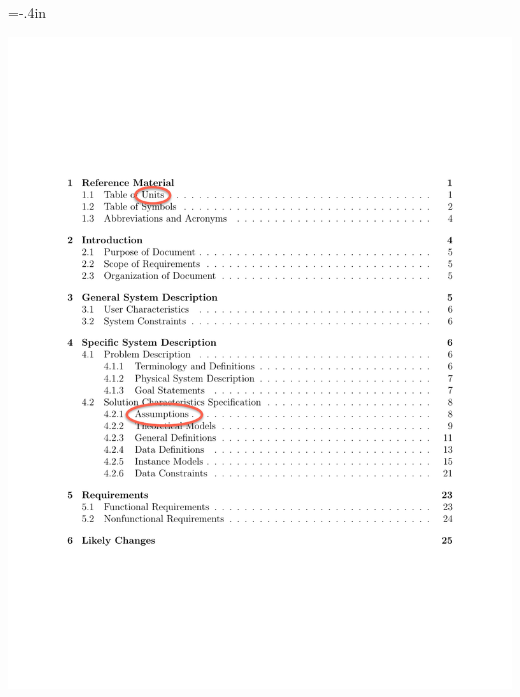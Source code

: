 \documentclass{beamer}
\begin{document}



\hoffset=-.4in %

\begin{frame}


\begin{center}
\includegraphics[scale=0.55]{TofC.pdf}
\end{center}

\end{frame}
\hoffset=0in

\end{document}
